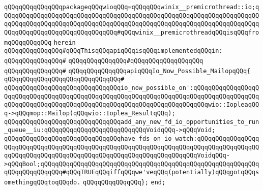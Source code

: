\verb|qQQqqQQqqQQqqQQqpackageqQQqwioqQQq=qQQqqQQqwinix__premicrothread::io;qQQqqQQqqQQqqQQqqQQqqQQqqQQqqQQqqQQqqQQqqQQqqQQqqQQqqQQqqQQqqQQqqQQqqQQqqQQqqQQqqQQqqQQqqQQqqQQqqQQqqQQqqQQqqQQqqQQqqQQqqQQqqQQqqQQqqQQqqQQqqQQqqQQqqQQqqQQqqQQqqQQqqQQqqQQq#qQQqwinix__premicrothreadqQQqisqQQqfromqQQqqQQqqQQq|\newline
\verb|herein|\newline
\newline
\verb|qQQqqQQqqQQqqQQq#qQQqThisqQQqapiqQQqisqQQqimplementedqQQqin:|\newline
\verb|qQQqqQQqqQQqqQQq#|\newline
\verb|qQQqqQQqqQQqqQQq#qQQqqQQqqQQqqQQqqQQq|\newline
\verb|qQQqqQQqqQQqqQQq#|\newline
\verb|qQQqqQQqqQQqqQQqapiqQQqIo_Now_Possible_MailopqQQq{|\newline
\verb|qQQqqQQqqQQqqQQqqQQqqQQqqQQqqQQq#|\newline
\verb|qQQqqQQqqQQqqQQqqQQqqQQqqQQqqQQqio_now_possible_on':qQQqqQQqqQQqqQQqqQQqqQQqqQQqqQQqqQQqqQQqqQQqqQQqqQQqqQQqqQQqqQQqqQQqqQQqqQQqqQQqqQQqqQQqqQQqqQQqqQQqqQQqqQQqqQQqqQQqqQQqqQQqqQQqqQQqqQQqqQQqqQQqwio::IopleaqQQq->qQQqmop::Mailop(qQQqwio::Ioplea_ResultqQQq);|\newline
\newline
\verb|qQQqqQQqqQQqqQQqqQQqqQQqqQQqqQQqadd_any_new_fd_io_opportunities_to_run_queue__iu:qQQqqQQqqQQqqQQqqQQqqQQqqQQqVoidqQQq->qQQqVoid;|\newline
\newline
\verb|qQQqqQQqqQQqqQQqqQQqqQQqqQQqqQQqhave_fds_on_io_watch:qQQqqQQqqQQqqQQqqQQqqQQqqQQqqQQqqQQqqQQqqQQqqQQqqQQqqQQqqQQqqQQqqQQqqQQqqQQqqQQqqQQqqQQqqQQqqQQqqQQqqQQqqQQqqQQqqQQqqQQqqQQqqQQqqQQqqQQqqQQqVoidqQQq->qQQqBool;qQQqqQQqqQQqqQQqqQQqqQQqqQQqqQQqqQQqqQQqqQQqqQQqqQQqqQQqqQQqqQQqqQQqqQQqqQQq#qQQqTRUEqQQqiffqQQqwe'veqQQq(potentially)qQQqgotqQQqsomethingqQQqtoqQQqdo.|\newline
\verb|qQQqqQQqqQQqqQQq};|\newline
\verb|end;|\newline
\newline

